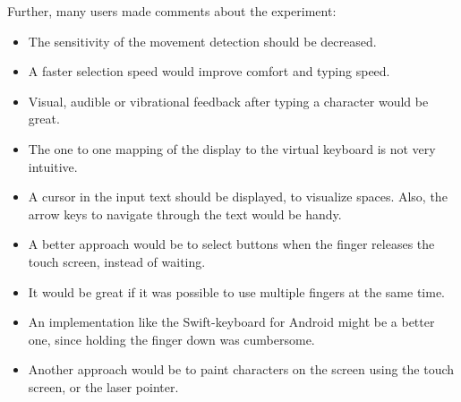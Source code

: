 Further, many users made comments about the experiment:
\begin{itemize}
	\item The sensitivity of the movement detection should be decreased.
	\item A faster selection speed would improve comfort and typing speed.
	\item Visual, audible or vibrational feedback after typing a character would be great.
	\item The one to one mapping of the display to the virtual keyboard is not very intuitive.
	\item A cursor in the input text should be displayed, to visualize spaces. Also, the arrow keys to navigate through the text would be handy.
	\item A better approach would be to select buttons when the finger releases the touch screen, instead of waiting.
	\item It would be great if it was possible to use multiple fingers at the same time.
	\item An implementation like the Swift-keyboard for Android might be a better one, since holding the finger down was cumbersome.
	\item Another approach would be to paint characters on the screen using the touch screen, or the laser pointer.
\end{itemize}
